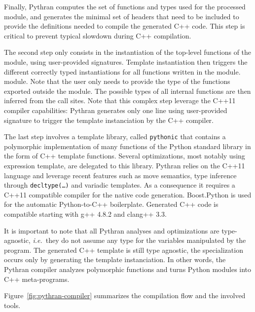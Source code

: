 \documentclass[10pt, onecolumn, preprint]{sigplanconf}
\providecommand{\ie}[1][~]{\textit{i.e.}#1}
\begin{document}
Finally, Pythran computes the set of functions and types used for the processed
module, and generates the minimal set of headers that need to be included to
provide the definitions needed to compile the generated C++ code. This step is
critical to prevent typical slowdown during C++ compilation.

The second step only consists in the instantiation of the top-level functions of
the module, using user-provided signatures. Template instantiation then triggers
the different correctly typed instantiations for all functions written in the
module. %
module. Note that the user only needs to provide the type of the functions
exported outside the module. The possible types of all internal functions are
then inferred from the call sites. Note that this complex step leverage the 
C++11 compiler capabilities: Pythran generates only one line using user-provided
signature to trigger the template instanciation by the C++ compiler.

The last step involves a template library, called \texttt{pythonic} that 
contains a polymorphic implementation of many functions of the Python standard
library in the form of C++ template functions. Several optimizations, most
notably using expression template, are delegated to this library. Pythran relies
on the C++11\cite{isocxx11} language and leverage recent features such as
move semantics, type inference through \texttt{decltype(\dots)} and variadic
templates.
As a consequence it requires a C++11 compatible compiler for the native code
generation. Boost.Python\cite{boostpython2007} is used for the automatic
Python-to-C++ boilerplate. Generated C++ code is compatible starting with g++ 
4.8.2 and clang++ 3.3.

It is important to note that all Pythran analyses and optimizations are
type-agnostic, \ie{they do not assume any type for the variables manipulated
by the program}. The generated C++ template is still type agnostic, the specialization occurs only by generating the template instanciation.
In other words, the Pythran compiler analyzes polymorphic functions and turns
Python modules into C++ meta-programs.

Figure~\ref{fig:pythran-compiler} summarizes the compilation flow and the 
involved tools.
\end{document}
